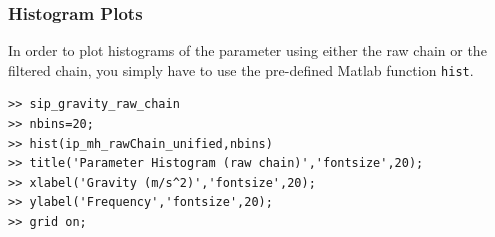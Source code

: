 \subsubsection{Histogram Plots}

In order to plot histograms of the parameter using either the raw chain or the filtered chain, you simply have to use the pre-defined Matlab function \verb+hist+.
%
\begin{lstlisting}[label=matlab:hist,caption={Matlab code for the histogram plot.}]
% inside Matlab
>> sip_gravity_raw_chain
>> nbins=20;
>> hist(ip_mh_rawChain_unified,nbins)
>> title('Parameter Histogram (raw chain)','fontsize',20);
>> xlabel('Gravity (m/s^2)','fontsize',20);
>> ylabel('Frequency','fontsize',20);
>> grid on;
\end{lstlisting}

